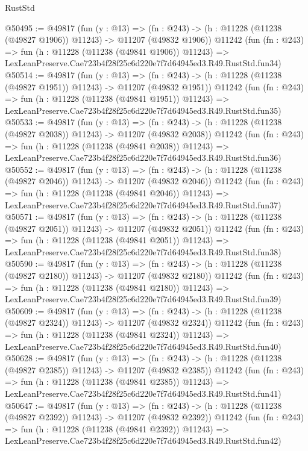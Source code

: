 \begin{lexlean}{RustStd}
\begin{coremodule}
@50495 := @49817
    (fun (y : @13) =>
    (fn : @243) -> (h : @11228 (@11238 (@49827 @1906)) @11243) -> @11207 (@49832 @1906))
    @11242
    (fun (fn : @243) =>
    fun (h : @11228 (@11238 (@49841 @1906)) @11243) =>
    LexLeanPreserve.Cae723b4f28f25c6d220e7f7d64945ed3.R49.RustStd.fun34)
@50514 := @49817
    (fun (y : @13) =>
    (fn : @243) -> (h : @11228 (@11238 (@49827 @1951)) @11243) -> @11207 (@49832 @1951))
    @11242
    (fun (fn : @243) =>
    fun (h : @11228 (@11238 (@49841 @1951)) @11243) =>
    LexLeanPreserve.Cae723b4f28f25c6d220e7f7d64945ed3.R49.RustStd.fun35)
@50533 := @49817
    (fun (y : @13) =>
    (fn : @243) -> (h : @11228 (@11238 (@49827 @2038)) @11243) -> @11207 (@49832 @2038))
    @11242
    (fun (fn : @243) =>
    fun (h : @11228 (@11238 (@49841 @2038)) @11243) =>
    LexLeanPreserve.Cae723b4f28f25c6d220e7f7d64945ed3.R49.RustStd.fun36)
@50552 := @49817
    (fun (y : @13) =>
    (fn : @243) -> (h : @11228 (@11238 (@49827 @2046)) @11243) -> @11207 (@49832 @2046))
    @11242
    (fun (fn : @243) =>
    fun (h : @11228 (@11238 (@49841 @2046)) @11243) =>
    LexLeanPreserve.Cae723b4f28f25c6d220e7f7d64945ed3.R49.RustStd.fun37)
@50571 := @49817
    (fun (y : @13) =>
    (fn : @243) -> (h : @11228 (@11238 (@49827 @2051)) @11243) -> @11207 (@49832 @2051))
    @11242
    (fun (fn : @243) =>
    fun (h : @11228 (@11238 (@49841 @2051)) @11243) =>
    LexLeanPreserve.Cae723b4f28f25c6d220e7f7d64945ed3.R49.RustStd.fun38)
@50590 := @49817
    (fun (y : @13) =>
    (fn : @243) -> (h : @11228 (@11238 (@49827 @2180)) @11243) -> @11207 (@49832 @2180))
    @11242
    (fun (fn : @243) =>
    fun (h : @11228 (@11238 (@49841 @2180)) @11243) =>
    LexLeanPreserve.Cae723b4f28f25c6d220e7f7d64945ed3.R49.RustStd.fun39)
@50609 := @49817
    (fun (y : @13) =>
    (fn : @243) -> (h : @11228 (@11238 (@49827 @2324)) @11243) -> @11207 (@49832 @2324))
    @11242
    (fun (fn : @243) =>
    fun (h : @11228 (@11238 (@49841 @2324)) @11243) =>
    LexLeanPreserve.Cae723b4f28f25c6d220e7f7d64945ed3.R49.RustStd.fun40)
@50628 := @49817
    (fun (y : @13) =>
    (fn : @243) -> (h : @11228 (@11238 (@49827 @2385)) @11243) -> @11207 (@49832 @2385))
    @11242
    (fun (fn : @243) =>
    fun (h : @11228 (@11238 (@49841 @2385)) @11243) =>
    LexLeanPreserve.Cae723b4f28f25c6d220e7f7d64945ed3.R49.RustStd.fun41)
@50647 := @49817
    (fun (y : @13) =>
    (fn : @243) -> (h : @11228 (@11238 (@49827 @2392)) @11243) -> @11207 (@49832 @2392))
    @11242
    (fun (fn : @243) =>
    fun (h : @11228 (@11238 (@49841 @2392)) @11243) =>
    LexLeanPreserve.Cae723b4f28f25c6d220e7f7d64945ed3.R49.RustStd.fun42)

\end{coremodule}
\end{lexlean}
